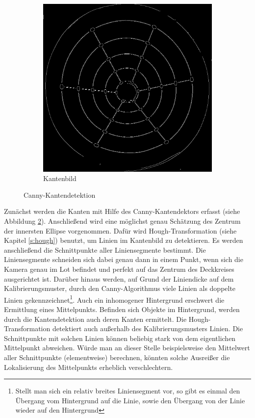 \begin{figure}[!htb]
\begin{subfigure}{.5\textwidth}
		\includegraphics[width=.9\textwidth]{images/canny.png}
		\caption{Kantenbild}
		\label{fig:afterCanny}
	\end{subfigure}
	\caption{Canny-Kantendetektion}
	\label{fig:canny}
\end{figure}

Zunächst werden die Kanten mit Hilfe des Canny-Kantendektors \cite{Canny1986} erfasst (siehe Abbildung \ref{fig:canny}).
Anschließend wird eine möglichst genau Schätzung des Zentrum der innersten Ellipse vorgenommen.
Dafür wird Hough-Transformation (siehe Kapitel \ref{s:hough}) benutzt, um Linien im Kantenbild zu detektieren.
Es werden anschließend die Schnittpunkte aller Liniensegmente bestimmt.
Die Liniensegmente schneiden sich dabei genau dann in einem Punkt, wenn sich die Kamera genau im Lot befindet und perfekt auf das Zentrum des Deckkreises ausgerichtet ist.
Darüber hinaus werden, auf Grund der Liniendicke auf dem Kalibrierungsmuster, durch den Canny-Algorithmus viele Linien als doppelte Linien gekennzeichnet\footnote{Stellt man sich ein relativ breites Liniensegment vor, so gibt es einmal den Übergang vom Hintergrund auf die Linie, sowie den Übergang von der Linie wieder auf den Hintergrund}. Auch ein inhomogener Hintergrund erschwert die Ermittlung eines Mittelpunkts. Befinden sich Objekte im Hintergrund, werden durch die Kantendetektion auch deren Kanten ermittelt. Die Hough-Transformation detektiert auch außerhalb des Kalibrierungsmusters Linien. Die Schnittpunkte mit solchen Linien können beliebig stark von dem eigentlichen Mittelpunkt abweichen. Würde man an dieser Stelle beispielsweise den Mittelwert aller Schnittpunkte (elementweise) berechnen, könnten solche Ausreißer die Lokalisierung des Mittelpunkts erheblich verschlechtern.


